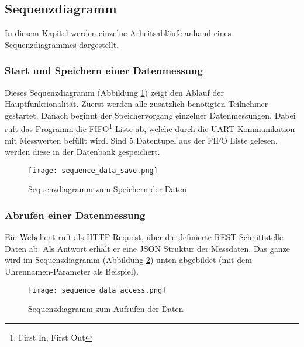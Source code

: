 \subsection{Sequenzdiagramm}
In diesem Kapitel werden einzelne Arbeitsabläufe anhand eines Sequenzdiagrammes dargestellt.
	\subsubsection{Start und Speichern einer Datenmessung}
    Dieses Sequenzdiagramm (Abbildung \ref{fig:sequence_save}) zeigt den Ablauf der Hauptfunktionalität.
    Zuerst werden alle zusätzlich benötigten Teilnehmer gestartet.
    Danach beginnt der Speichervorgang einzelner Datenmessungen.
    Dabei ruft das Programm die FIFO\footnote{First In, First Out}-Liste ab, welche durch die UART Kommunikation mit Messwerten befüllt wird.
    Sind 5 Datentupel aus der FIFO Liste gelesen, werden diese in der Datenbank gespeichert.
    \begin{figure}[H]
        \centering
        \texttt{[image: sequence\_data\_save.png]}
        \caption{Sequenzdiagramm zum Speichern der Daten}
        \label{fig:sequence_save}
    \end{figure}

    \clearpage
    \subsubsection{Abrufen einer Datenmessung}
    Ein Webclient ruft als HTTP Request, über die definierte REST Schnittstelle Daten ab.
    Als Antwort erhält er eine JSON Struktur der Messdaten.
    Das ganze wird im Sequenzdiagramm (Abbildung \ref{fig:sequence_get}) unten abgebildet (mit dem Uhrennamen-Parameter als Beispiel).
    \begin{figure}[H]
        \centering
        \texttt{[image: sequence\_data\_access.png]}
        \caption{Sequenzdiagramm zum Aufrufen der Daten}
        \label{fig:sequence_get}
    \end{figure}
